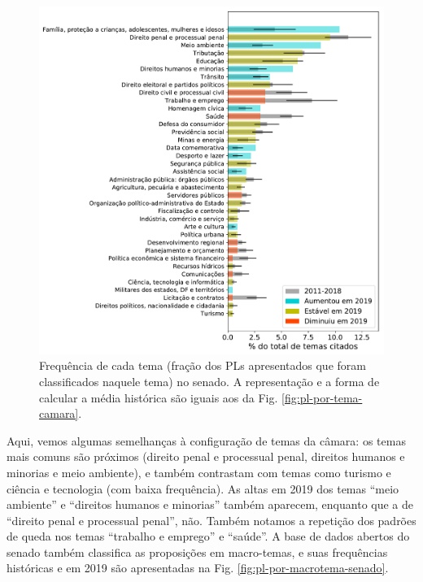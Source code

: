 \documentclass[12pt,a4paper]{article}
\begin{document}
\begin{figure}[H]
\centering
\includegraphics[width=1.0\textwidth]{graficos/senado/pls-temas-senado-r-completo.pdf}
\caption{Frequência de cada tema (fração dos PLs apresentados que foram classificados
  naquele tema) no senado. A representação e a forma de calcular a média histórica são iguais
  aos da Fig. \ref{fig:pl-por-tema-camara}.}
\label{fig:pl-por-tema-senado}
\end{figure}

Aqui, vemos algumas semelhanças à configuração de temas da câmara: os temas mais comuns são
próximos (direito penal e processual penal, direitos humanos e minorias e meio ambiente), e
também contrastam com temas como turismo e ciência e tecnologia (com baixa frequência).
As altas em 2019 dos temas ``meio ambiente'' e ``direitos humanos e minorias'' também aparecem,
enquanto que a de ``direito penal e processual penal'', não. Também notamos a repetição dos
padrões de queda nos temas ``trabalho e emprego'' e ``saúde''.
A base de dados abertos do senado também classifica as proposições em macro-temas, e suas frequências
históricas e em 2019 são apresentadas na Fig. \ref{fig:pl-por-macrotema-senado}.
\end{document}
